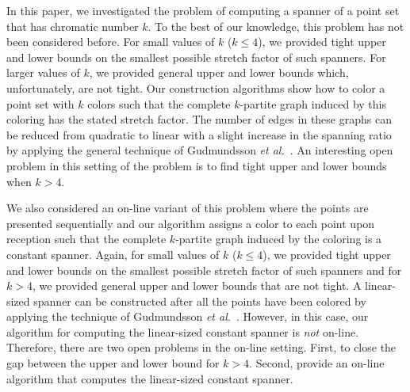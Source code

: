 \documentclass[pdftex,leqno,fleqn,12pts]{llncs}
\begin{document}
In this paper, we investigated the problem of computing a spanner 
of a point set that has chromatic 
number $k$. To the best of our knowledge, this problem has not been 
considered before. For small values of $k$ ($k\leq 4$), we provided 
tight upper and lower bounds on the smallest possible stretch factor 
of such spanners. For larger values of $k$, we provided general 
upper and lower bounds which, unfortunately, are not tight. Our construction algorithms
show how to color a point set with $k$ colors such that the complete $k$-partite graph
induced by this coloring has the stated stretch factor. The number of edges in these
graphs can be reduced from quadratic to linear with a slight increase in the spanning ratio by applying
the general technique of Gudmundsson  \emph{et al.}~\cite{glns-adogg-02}. An interesting open problem in this setting of the problem is to find tight upper and lower bounds when $k>4$.

We also considered an on-line variant of this problem where the points
are presented sequentially and our algorithm 
assigns a color to each point upon reception such that the complete $k$-partite graph
induced by the coloring is a constant spanner. Again, for small values of $k$ ($k\leq 4$), we provided 
tight upper and lower bounds on the smallest possible stretch factor 
of such spanners and for $k>4$, we provided general 
upper and lower bounds that are not tight.
A linear-sized spanner can be constructed after all the points have been colored by applying the technique of Gudmundsson  \emph{et al.}~\cite{glns-adogg-02}. However, in this case, our algorithm for computing the linear-sized constant spanner is {\em not} on-line.
Therefore, there are two open problems in the on-line setting. First, to close the gap between the upper and lower bound for $k>4$. Second, provide an on-line algorithm
that computes the linear-sized constant spanner.
 



\end{document}
